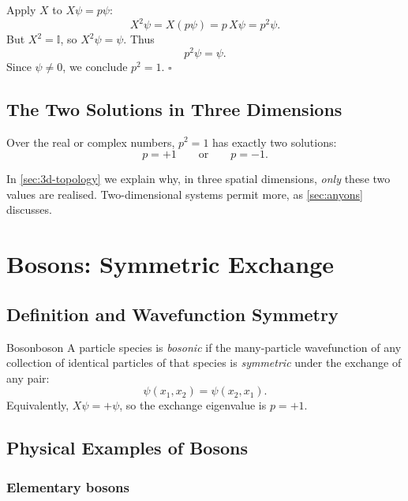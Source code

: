 \documentclass[11pt,a4paper]{article}
\newcommand{\id}{\mathbb{I}}
\begin{document}
Apply $X$ to $X\psi = p\psi$:
\[
  X^2\psi = X(p\psi) = p\,X\psi = p^2\psi.
\]
But $X^2 = \id$, so $X^2\psi = \psi$.  Thus
\[
  p^2\psi = \psi.
\]
Since $\psi \neq 0$, we conclude $p^2 = 1$. $\square$

\subsection{The Two Solutions in Three Dimensions}

Over the real or complex numbers, $p^2 = 1$ has exactly two solutions:
\[
  p = +1 \qquad\text{or}\qquad p = -1.
\]

In \cref{sec:3d-topology} we explain why, in three spatial dimensions,
\emph{only} these two values are realised.  Two-dimensional systems permit
more, as \cref{sec:anyons} discusses.

\section{Bosons: Symmetric Exchange}

\subsection{Definition and Wavefunction Symmetry}

\begin{defn}{Boson}{boson}
  A particle species is \emph{bosonic} if the many-particle wavefunction of
  any collection of identical particles of that species is \emph{symmetric}
  under the exchange of any pair:
  \[
    \psi(x_1, x_2) = \psi(x_2, x_1).
  \]
  Equivalently, $X\psi = +\psi$, so the exchange eigenvalue is $p = +1$.
\end{defn}

\subsection{Physical Examples of Bosons}

\subsubsection{Elementary bosons}
\end{document}
